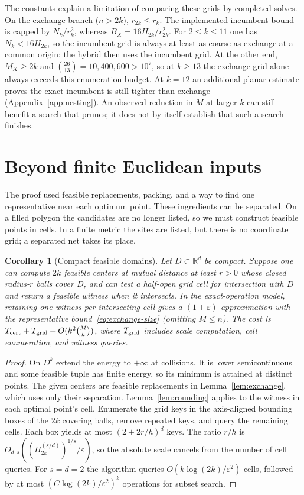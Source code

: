 \documentclass[a4paper,12pt]{article}
\newtheorem{corollary}[theorem]{Corollary}
\numberwithin{equation}{section}
\begin{document}
The constants explain a limitation of comparing these grids by completed solves. On the exchange
branch ($n>2k$), $r_{2k}\le r_k$. The implemented incumbent bound is capped by
$N_k/r_k^2$, whereas $B_X=16H_{2k}/r_{2k}^2$. For $2\le k\le11$ one has $N_k<16H_{2k}$,
so the incumbent grid is always at least as coarse as exchange at a common origin; the hybrid
then uses the incumbent grid. At the other end, $M_X\ge2k$ and
$\binom{26}{13}=10{,}400{,}600>10^7$, so at $k\ge13$ the exchange grid alone always exceeds
this enumeration budget. At $k=12$ an additional planar estimate proves the exact incumbent is still tighter than exchange
(Appendix~\ref{app:nesting}). An observed reduction in $M$ at larger $k$ can still
benefit a search that prunes; it does not by itself establish that such a search finishes.


\section{Beyond finite Euclidean inputs}\label{sec:extensions}
The proof used feasible replacements, packing, and a way to find one representative
near each optimum point. These ingredients can be separated. On a filled polygon
the candidates are no longer listed, so we must construct feasible points in cells.
In a finite metric the sites are listed, but there is no coordinate grid; a
separated net takes its place.
\begin{corollary}[Compact feasible domains]\label{cor:domains}
Let $D\subset\mathbb R^d$ be compact. Suppose one can compute $2k$ feasible
centers at mutual distance at least $r>0$ whose closed radius-$r$ balls cover
$D$, and can test a half-open grid cell for intersection with $D$ and return a
feasible witness when it intersects. In the exact-operation model, retaining
one witness per intersecting cell gives a $(1+\varepsilon)$-approximation with
the representative bound~\eqref{eq:exchange-size} (omitting $M\le n$).
The cost is $T_{\rm cert}+T_{\rm grid}+O(k^2\binom Mk)$, where $T_{\rm grid}$
includes scale computation, cell enumeration, and witness queries.
\end{corollary}
\begin{proof}
On $D^k$ extend the energy to $+\infty$ at collisions. It is lower semicontinuous
and some feasible tuple has finite energy, so its minimum is attained at distinct
points. The given centers are feasible replacements in Lemma~\ref{lem:exchange},
which uses only their separation. Lemma~\ref{lem:rounding} applies to the
witness in each optimal point's cell. Enumerate the grid keys in the axis-aligned
bounding boxes of the $2k$ covering balls, remove repeated keys, and query the
remaining cells. Each box yields at most $(2+2r/h)^d$ keys. The ratio $r/h$ is
$O_{d,s}((H_{2k}^{(s/d)})^{1/s}/\varepsilon)$, so the absolute scale cancels
from the number of cell queries. For $s=d=2$ the algorithm queries
$O(k\log(2k)/\varepsilon^2)$ cells, followed by at most
$(C\log(2k)/\varepsilon^2)^k$ operations for subset search.
\end{proof}
\end{document}
